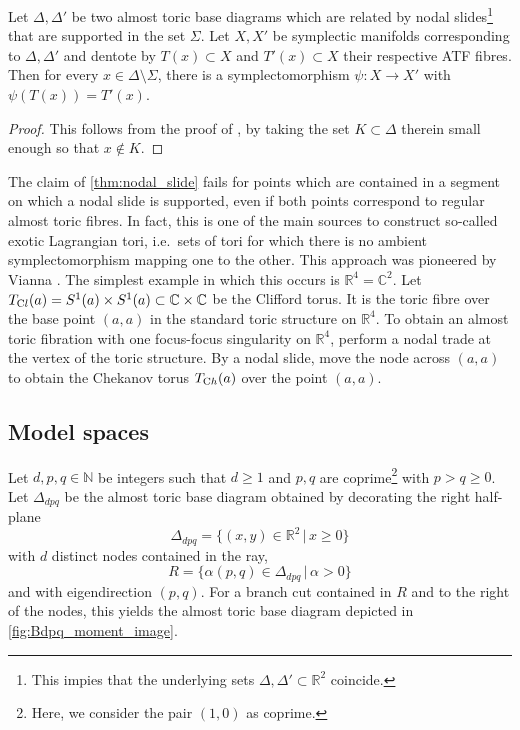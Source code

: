 \documentclass[12pt,a4paper,draft]{scrartcl}
\begin{document}
\begin{lemma}
    \label{thm:nodal_slide}
    Let $\Delta, \Delta'$ be two almost toric base diagrams which are related by nodal slides\footnote{This impies that the underlying sets $\Delta, \Delta' \subset \mathbb{R}^2$ coincide.} that are supported in the set $\Sigma$. Let $X,X'$ be symplectic manifolds corresponding to $\Delta,\Delta'$ and dentote by $T(x) \subset X$ and $T'(x) \subset X$ their respective ATF fibres.
Then for every $x \in \Delta \setminus \Sigma$, there is a symplectomorphism $\psi \colon X \rightarrow X'$ with $\psi(T(x)) = T'(x)$.
\end{lemma}

\begin{proof}
    This follows from the proof of \cite[Theorem 8.10]{evans2021atfs}, by taking the set $K \subset \Delta$ therein small enough so that $x \notin K$.
\end{proof}

\begin{remark}
    \label{rk:slides_ray}
    The claim of \cref{thm:nodal_slide} fails for points which are contained in a segment on which a nodal slide is supported, even if both points correspond to regular almost toric fibres.
In fact, this is one of the main sources to construct so-called exotic Lagrangian tori, i.e.\ sets of tori for which there is no ambient symplectomorphism mapping one to the other.
This approach was pioneered by Vianna \cite{Via16,Via17}. The simplest example in which this occurs is $\mathbb{R}^4 = \mathbb{C}^2$. Let $T_{\text Cl}(a) = S^1(a) \times S^1(a) \subset \mathbb{C} \times \mathbb{C}$ be the Clifford torus.
It is the toric fibre over the base point $(a,a)$ in the standard toric structure on $\mathbb{R}^4$. To obtain an almost toric fibration with one focus-focus singularity on $\mathbb{R}^4$, perform a nodal trade at the vertex of the toric structure.
By a nodal slide, move the node across $(a,a)$ to obtain the Chekanov torus $T_{\text Ch}(a)$ over the point $(a,a)$.
\end{remark}


\subsection{Model spaces}

Let $d,p,q \in \mathbb{N}$ be integers such that $d≥1$ and $p,q$ are coprime\footnote{Here, we consider the pair $(1,0)$ as coprime.} with $p>q≥0$.
Let $\Delta_{dpq}$ be the almost toric base diagram obtained by decorating the right half-plane
$$\Delta_{dpq} = \{ (x,y) \in \mathbb{R}^2 \, \vert \, x \geqslant 0 \}$$
with $d$ distinct nodes contained in the ray,
\begin{equation}
  \label{eqn:eigenline}
  R = \{\alpha (p,q) \in \Delta_{dpq} \, \vert \, \alpha > 0 \}
\end{equation}
and with eigendirection $(p,q)$. For a branch cut contained in $R$ and to the right of the nodes, this yields the almost toric base diagram depicted in \cref{fig:Bdpq_moment_image}.
\end{document}
